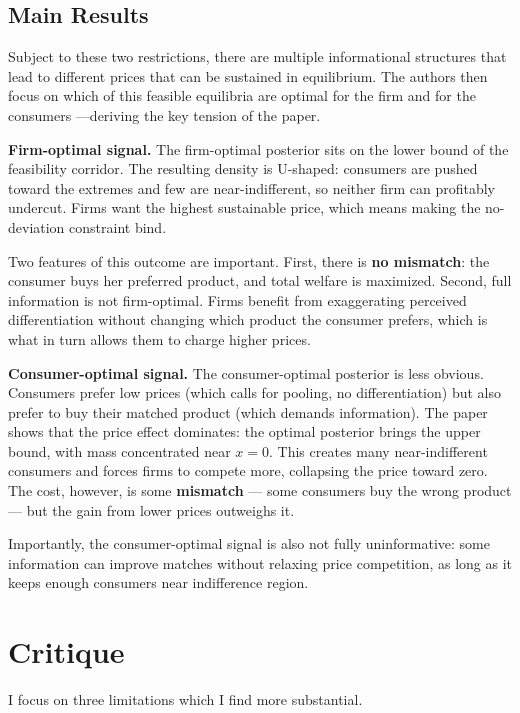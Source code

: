 \documentclass[12pt, a4paper]{article}
\begin{document}
\subsection{Main Results}
Subject to these two restrictions, there are multiple informational structures that lead to different prices that can be sustained in equilibrium. The authors then focus on which of this feasible equilibria are optimal for the firm and for the consumers ---deriving the key tension of the paper. 

\textbf{Firm-optimal signal.} The firm-optimal posterior sits on the lower bound of the feasibility corridor. The resulting density is U-shaped: consumers are pushed toward the extremes and few are near-indifferent, so neither firm can profitably undercut. Firms want the highest sustainable price, which means making the no-deviation constraint bind.

Two features of this outcome are important. First, there is \textbf{no mismatch}: the consumer buys her preferred product, and total welfare is maximized. Second, full information is not firm-optimal. Firms benefit from exaggerating perceived differentiation without changing which product the consumer prefers, which is what in turn allows them to charge higher prices.

\textbf{Consumer-optimal signal.} The consumer-optimal posterior is less obvious. Consumers prefer low prices (which calls for pooling, no differentiation) but also prefer to buy their matched product (which demands information). The paper shows that the price effect dominates: the optimal posterior brings the upper bound, with mass concentrated near $x = 0$. This creates many near-indifferent consumers and forces firms to compete more, collapsing the price toward zero. The cost, however, is some \textbf{mismatch} --- some consumers buy the wrong product --- but the gain from lower prices outweighs it.

Importantly, the consumer-optimal signal is also not fully uninformative: some information can improve matches without relaxing price competition, as long as it keeps enough consumers near indifference region.

\section{Critique}

I focus on three limitations which I find more substantial.
\end{document}
